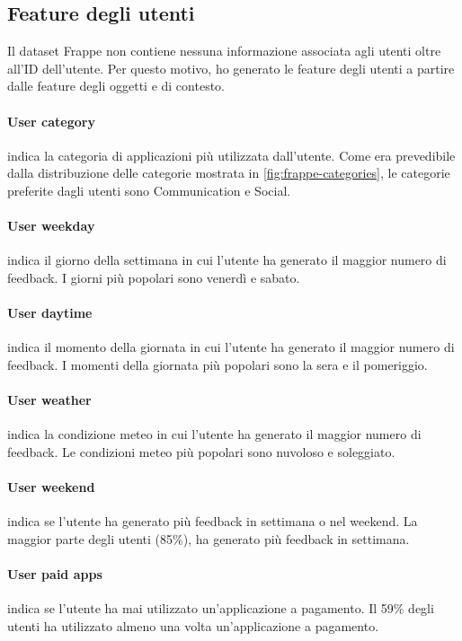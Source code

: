 \documentclass[12pt,italian]{report}
\begin{document}
\subsection{Feature degli utenti}
Il dataset Frappe non contiene nessuna informazione associata agli utenti oltre all'ID dell'utente. Per questo motivo, ho generato le feature degli utenti a partire dalle feature degli oggetti e di contesto.

\paragraph{User category} indica la categoria di applicazioni più utilizzata dall'utente. Come era prevedibile dalla distribuzione delle categorie mostrata in \autoref{fig:frappe-categories}, le categorie preferite dagli utenti sono Communication e Social.

\paragraph{User weekday} indica il giorno della settimana in cui l'utente ha generato il maggior numero di feedback. I giorni più popolari sono venerdì e sabato.

\paragraph{User daytime} indica il momento della giornata in cui l'utente ha generato il maggior numero di feedback. I momenti della giornata più popolari sono la sera e il pomeriggio.

\paragraph{User weather} indica la condizione meteo in cui l'utente ha generato il maggior numero di feedback. Le condizioni meteo più popolari sono nuvoloso e soleggiato.

\paragraph{User weekend} indica se l'utente ha generato più feedback in settimana o nel weekend. La maggior parte degli utenti (85\%), ha generato più feedback in settimana.

\paragraph{User paid apps} indica se l'utente ha mai utilizzato un'applicazione a pagamento. Il 59\% degli utenti ha utilizzato almeno una volta un'applicazione a pagamento.
\end{document}
